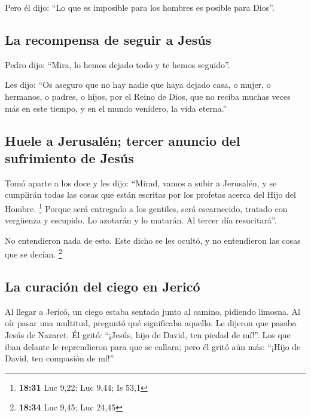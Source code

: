  Pero él dijo: ``Lo que es imposible para los hombres es
posible para Dios''.

\hypertarget{la-recompensa-de-seguir-a-jesuxfas}{%
\subsection{La recompensa de seguir a
Jesús}\label{la-recompensa-de-seguir-a-jesuxfas}}

 Pedro dijo: ``Mira, lo hemos dejado todo y te hemos
seguido''.

 Les dijo: ``Os aseguro que no hay nadie que haya dejado
casa, o mujer, o hermanos, o padres, o hijos, por el Reino de Dios,
 que no reciba muchas veces más en este tiempo, y en el
mundo venidero, la vida eterna.''

\hypertarget{huele-a-jerusaluxe9n-tercer-anuncio-del-sufrimiento-de-jesuxfas}{%
\subsection{Huele a Jerusalén; tercer anuncio del sufrimiento de
Jesús}\label{huele-a-jerusaluxe9n-tercer-anuncio-del-sufrimiento-de-jesuxfas}}

 Tomó aparte a los doce y les dijo: ``Mirad, vamos a
subir a Jerusalén, y se cumplirán todas las cosas que están escritas por
los profetas acerca del Hijo del Hombre. \footnote{\textbf{18:31} Luc
  9,22; Luc 9,44; Is 53,1}  Porque será entregado a los
gentiles, será escarnecido, tratado con vergüenza y escupido.
 Lo azotarán y lo matarán. Al tercer día resucitará''.

 No entendieron nada de esto. Este dicho se les ocultó, y
no entendieron las cosas que se decían. \footnote{\textbf{18:34} Luc
  9,45; Luc 24,45}

\hypertarget{la-curaciuxf3n-del-ciego-en-jericuxf3}{%
\subsection{La curación del ciego en
Jericó}\label{la-curaciuxf3n-del-ciego-en-jericuxf3}}

 Al llegar a Jericó, un ciego estaba sentado junto al
camino, pidiendo limosna.  Al oír pasar una multitud,
preguntó qué significaba aquello.  Le dijeron que pasaba
Jesús de Nazaret.  Él gritó: ``¡Jesús, hijo de David, ten
piedad de mí!''.  Los que iban delante le reprendieron
para que se callara; pero él gritó aún más: ``¡Hijo de David, ten
compasión de mí!''

